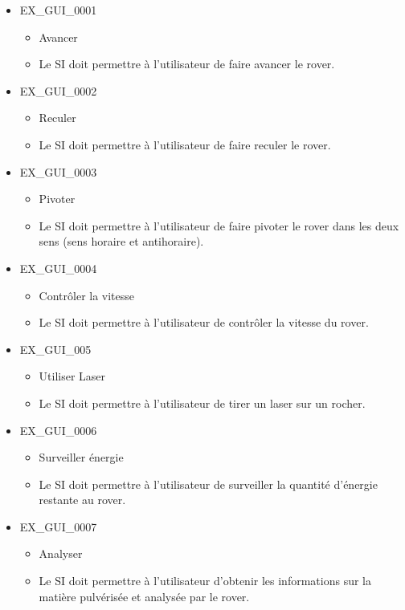 \documentclass[12pt,a4paper]{scrartcl}
\begin{document}
\begin{itemize}

\item EX\_GUI\_0001
\begin{itemize}
\item Avancer
\item Le SI doit permettre à l'utilisateur de faire avancer le rover.
\end{itemize}

\item EX\_GUI\_0002
\begin{itemize}
\item Reculer
\item Le SI doit permettre à l'utilisateur de faire reculer le rover.
\end{itemize}

\item EX\_GUI\_0003
\begin{itemize}
\item Pivoter
\item Le SI doit permettre à l'utilisateur de faire pivoter le rover dans les 			deux sens (sens horaire et antihoraire).
\end{itemize}

\item EX\_GUI\_0004
\begin{itemize}
\item Contrôler la vitesse
\item Le SI doit permettre à l'utilisateur de contrôler la vitesse du rover.
\end{itemize}

\item EX\_GUI\_005
\begin{itemize}
\item Utiliser Laser
\item Le SI doit permettre à l'utilisateur de tirer un laser sur un rocher.
\end{itemize}


\item EX\_GUI\_0006
\begin{itemize}
\item Surveiller énergie
\item Le SI doit permettre à l'utilisateur de surveiller la quantité d'énergie
		restante au rover.
\end{itemize}

\item EX\_GUI\_0007
\begin{itemize}
\item Analyser
\item Le SI doit permettre à l'utilisateur d'obtenir les informations sur la 
		matière pulvérisée et analysée par le rover.
\end{itemize}


\end{itemize}
\end{document}
